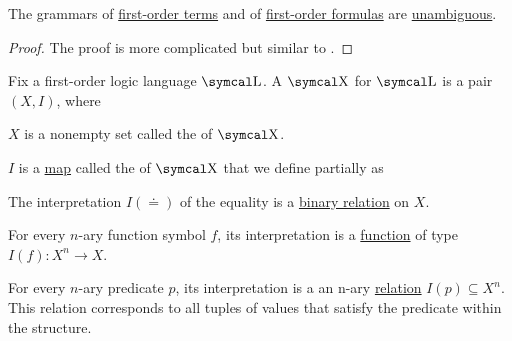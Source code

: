 \begin{proposition}\label{thm:first_order_terms_and_formulas_are_unambiguous}
  The grammars of \hyperref[def:first_order_language/term]{first-order terms} and of \hyperref[def:first_order_language/formula]{first-order formulas} are \hyperref[def:grammar_derivation/ambiguity]{unambiguous}.
\end{proposition}
\begin{proof}
  The proof is more complicated but similar to .
\end{proof}

\begin{definition}\label{def:first_order_structure}
  Fix a first-order logic language \( \CL \). A  \( \CX \) for \( \CL \) is a pair \( (X, I) \), where

  \begin{DefEnum}
     \( X \) is a nonempty set called the  of \( \CX \).

     \( I \) is a \hyperref[def:function]{map} called the  of \( \CX \) that we define partially as
    \begin{DefEnum}
       The interpretation \( I(\doteq) \) of the equality is a \hyperref[def:binary_relation]{binary relation} on \( X \).

       For every \( n \)-ary function symbol \( f \), its interpretation is a \hyperref[def:function]{function} of type \( I(f): X^n \to X \).

       For every \( n \)-ary predicate \( p \), its interpretation is a an n-ary \hyperref[def:relation]{relation} \( I(p) \subseteq X^n \). This relation corresponds to all tuples of values that satisfy the predicate within the structure.
    \end{DefEnum}
  \end{DefEnum}
\end{definition}

